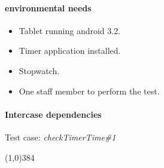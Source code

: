 \paragraph{environmental needs}
	\begin{itemize}
		\item Tablet running android 3.2.
		\item Timer application installed.
		\item Stopwatch.
		\item One staff member to perform the test.
	\end{itemize}
\paragraph{Intercase dependencies}
	Test case: \textit{checkTimerTime\#1}
\begin{center}
	\line(1,0){384}
\end{center}